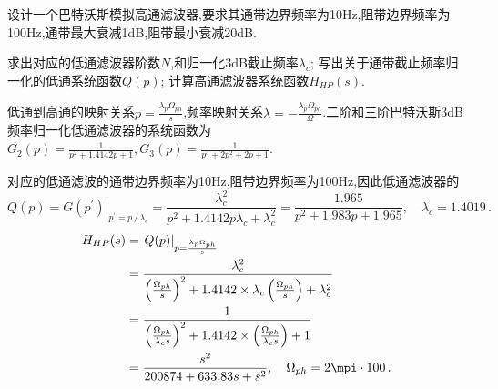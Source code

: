 \documentclass[list,answers,csize4,custom]{sysuexam}
\begin{document}
\begin{groups}
\begin{questions}[rst]
    \question[10] 设计一个巴特沃斯模拟高通滤波器,要求其通带边界频率为10Hz,阻带边界频率为100Hz,通带最大衰减1dB,阻带最小衰减20dB.
    \begin{subquestions}
        \subquestion[3] 求出对应的低通滤波器阶数$N$,和归一化3dB截止频率$\lambda_c$;
        \subquestion[3] 写出关于通带截止频率归一化的低通系统函数$Q(p)$;
        \subquestion[4] 计算高通滤波器系统函数$H_{HP}(s)$.
    \end{subquestions}
    \hint 低通到高通的映射关系$p=\frac{\lambda_{p}\Omega_{ph}}{s}$,频率映射关系$\lambda=-\frac{\lambda_{p}\Omega_{ph}}{\Omega}$.二阶和三阶巴特沃斯3dB频率归一化低通滤波器的系统函数为$G_{2}(p)=\frac{1}{p^{2}+1.4142 p+1}, G_{3}(p)=\frac{1}{p^{3}+2 p^{2}+2 p+1}$.
    \begin{solution}
        \begin{subsolutions}
            \subsolution \subanswers 对应的低通滤波的通带边界频率为10Hz,阻带边界频率为100Hz,因此低通滤波器的
            \subsolution 
            $$ Q(p)=\left.G\left(p^{\prime}\right)\right|_{p^{\prime}=p\, /\, \lambda_{c}}=\frac{\lambda_{c}^{2}}{p^{2}+1.4142 p \lambda_{c}+\lambda_{c}^{2}}=\frac{1.965}{p^{2}+1.983 p+1.965},\quad \lambda_{c}=1.4019\,.
        $$
            \subsolution
            $$
        \begin{aligned}
        H_{H P}(s) &=\left.Q(p)\right|_{p=\frac{\lambda_{p} \Omega_{p h}}{s}}\\
        &=\frac{\lambda_{c}^{2}}{\left(\frac{\Omega_{p h}}{s}\right)^{2}+1.4142 \times \lambda_{c}\left(\frac{\Omega_{p h}}{s}\right)+\lambda_{c}^{2}}\\
        &=\frac{1}{\left(\frac{\Omega_{p h}}{\lambda_{c} s}\right)^{2}+1.4142 \times\left(\frac{\Omega_{p h}}{\lambda_{c} s}\right)+1} \\
        &=\frac{s^{2}}{200874+633.83 s+s^{2}}, \quad \Omega_{p h}=2 \mpi \cdot 100\,.
        \end{aligned}
        $$
        \end{subsolutions}


\end{solution}
\end{questions}
\end{groups}
\end{document}
